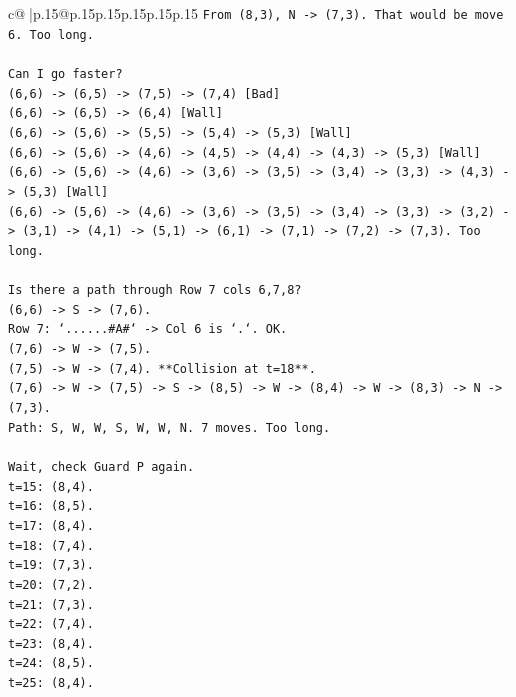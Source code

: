 \documentclass{article}
\begin{document}
{\begin{supertabular}{c@{$\;$}|p{.15\linewidth}@{}p{.15\linewidth}p{.15\linewidth}p{.15\linewidth}p{.15\linewidth}p{.15\linewidth}}
{{{\texttt{From (8,3), N {-}> (7,3). That would be move 6. Too long.} \\
\\ 
\texttt{Can I go faster?} \\
\texttt{(6,6) {-}> (6,5) {-}> (7,5) {-}> (7,4) {[}Bad{]}} \\
\texttt{(6,6) {-}> (6,5) {-}> (6,4) {[}Wall{]}} \\
\texttt{(6,6) {-}> (5,6) {-}> (5,5) {-}> (5,4) {-}> (5,3) {[}Wall{]}} \\
\texttt{(6,6) {-}> (5,6) {-}> (4,6) {-}> (4,5) {-}> (4,4) {-}> (4,3) {-}> (5,3) {[}Wall{]}} \\
\texttt{(6,6) {-}> (5,6) {-}> (4,6) {-}> (3,6) {-}> (3,5) {-}> (3,4) {-}> (3,3) {-}> (4,3) {-}> (5,3) {[}Wall{]}} \\
\texttt{(6,6) {-}> (5,6) {-}> (4,6) {-}> (3,6) {-}> (3,5) {-}> (3,4) {-}> (3,3) {-}> (3,2) {-}> (3,1) {-}> (4,1) {-}> (5,1) {-}> (6,1) {-}> (7,1) {-}> (7,2) {-}> (7,3). Too long.} \\
\\ 
\texttt{Is there a path through Row 7 cols 6,7,8?} \\
\texttt{(6,6) {-}> S {-}> (7,6).} \\
\texttt{Row 7: `......\#A\#` {-}> Col 6 is `.`. OK.} \\
\texttt{(7,6) {-}> W {-}> (7,5).} \\
\texttt{(7,5) {-}> W {-}> (7,4). **Collision at t=18**.} \\
\texttt{(7,6) {-}> W {-}> (7,5) {-}> S {-}> (8,5) {-}> W {-}> (8,4) {-}> W {-}> (8,3) {-}> N {-}> (7,3).} \\
\texttt{Path: S, W, W, S, W, W, N. 7 moves. Too long.} \\
\\ 
\texttt{Wait, check Guard P again.} \\
\texttt{t=15: (8,4).} \\
\texttt{t=16: (8,5).} \\
\texttt{t=17: (8,4).} \\
\texttt{t=18: (7,4).} \\
\texttt{t=19: (7,3).} \\
\texttt{t=20: (7,2).} \\
\texttt{t=21: (7,3).} \\
\texttt{t=22: (7,4).} \\
\texttt{t=23: (8,4).} \\
\texttt{t=24: (8,5).} \\
\texttt{t=25: (8,4).} \\
}}}
\end{supertabular}}
\end{document}

